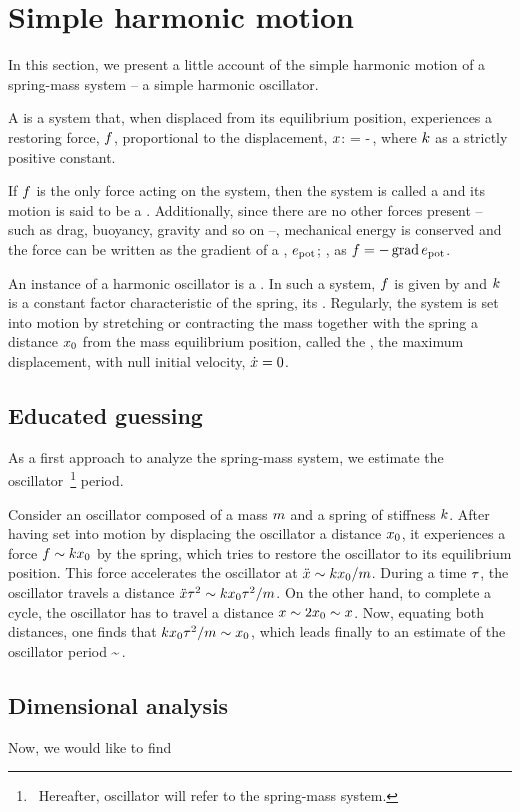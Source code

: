 \section{Simple harmonic motion}
In this section, we present a little account of the simple harmonic motion of a spring-mass system -- a simple harmonic oscillator.

A  is a system that, when displaced from its equilibrium position, experiences a restoring force, $f$, proportional to the displacement, $x$:
\beq
\force = -\kspring\disp\,,
\eeq
where $k$ as a strictly positive constant.

If $f$ is the only force acting on the system, then the system is called a  and its motion is said to be a . Additionally, since there are no other forces present -- such as drag, buoyancy, gravity and so on --, mechanical energy is conserved and the force can be written as the gradient of a , $e_\text{pot}$; \ie, as $f = -\operatorname{grad}e_\text{pot}$.

An instance of a harmonic oscillator is a . In such a system, $f$ is given by  and $k$ is a constant factor characteristic of the spring, its . Regularly, the system is set into motion by stretching or contracting the mass together with the spring a distance $x_0$ from the mass equilibrium position, called the , the maximum displacement, with null initial velocity, $\dot{x} = 0$.


\subsection{Educated guessing}
As a first approach to analyze the spring-mass system, we estimate the oscillator~\footnote{~Hereafter, oscillator will refer to the spring-mass system.} period.

Consider an oscillator composed of a mass $m$ and a spring of stiffness $k$. After having set into motion by displacing the oscillator a distance $x_0$, it experiences a force $f\sim kx_0$ by the spring, which tries to restore the oscillator to its equilibrium position. This force accelerates the oscillator at $\ddot{x}\sim kx_0/m$. During a time $\tau$, the oscillator travels a distance $\ddot{x}\tau^2\sim kx_0\tau^2/m$. On the other hand, to complete a cycle, the oscillator has to travel a distance $x\sim 2x_0\sim x$. Now, equating both distances, one finds that $kx_0\tau^2/m\sim x_0$, which leads finally to an estimate of the oscillator period
\beq
\oper\sim\sqrt{\dfrac{\mass}{\kspring}}\,.
\eeq


\subsection{Dimensional analysis}
Now, we would like to find 
